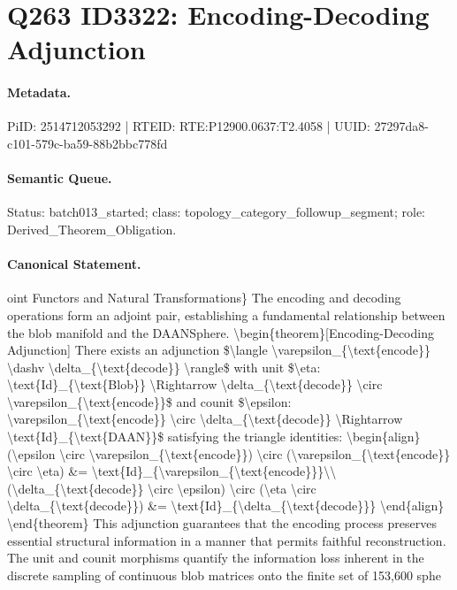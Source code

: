 \section*{Q263 ID3322: Encoding-Decoding Adjunction}
\paragraph{Metadata.}
PiID: 2514712053292 | RTEID: RTE:P12900.0637:T2.4058 | UUID: 27297da8-c101-579c-ba59-88b2bbc778fd

\paragraph{Semantic Queue.}
Status: batch013\_started; class: topology\_category\_followup\_segment; role: Derived\_Theorem\_Obligation.

\paragraph{Canonical Statement.}
oint Functors and Natural Transformations\} The encoding and decoding operations form an adjoint pair, establishing a fundamental relationship between the blob manifold and the DAANSphere. \textbackslash{}begin\{theorem\}[Encoding-Decoding Adjunction] There exists an adjunction \$\textbackslash{}langle \textbackslash{}varepsilon\_\{\textbackslash{}text\{encode\}\} \textbackslash{}dashv \textbackslash{}delta\_\{\textbackslash{}text\{decode\}\} \textbackslash{}rangle\$ with unit \$\textbackslash{}eta: \textbackslash{}text\{Id\}\_\{\textbackslash{}text\{Blob\}\} \textbackslash{}Rightarrow \textbackslash{}delta\_\{\textbackslash{}text\{decode\}\} \textbackslash{}circ \textbackslash{}varepsilon\_\{\textbackslash{}text\{encode\}\}\$ and counit \$\textbackslash{}epsilon: \textbackslash{}varepsilon\_\{\textbackslash{}text\{encode\}\} \textbackslash{}circ \textbackslash{}delta\_\{\textbackslash{}text\{decode\}\} \textbackslash{}Rightarrow \textbackslash{}text\{Id\}\_\{\textbackslash{}text\{DAAN\}\}\$ satisfying the triangle identities: \textbackslash{}begin\{align\} (\textbackslash{}epsilon \textbackslash{}circ \textbackslash{}varepsilon\_\{\textbackslash{}text\{encode\}\}) \textbackslash{}circ (\textbackslash{}varepsilon\_\{\textbackslash{}text\{encode\}\} \textbackslash{}circ \textbackslash{}eta) \&= \textbackslash{}text\{Id\}\_\{\textbackslash{}varepsilon\_\{\textbackslash{}text\{encode\}\}\}\textbackslash{}\textbackslash{} (\textbackslash{}delta\_\{\textbackslash{}text\{decode\}\} \textbackslash{}circ \textbackslash{}epsilon) \textbackslash{}circ (\textbackslash{}eta \textbackslash{}circ \textbackslash{}delta\_\{\textbackslash{}text\{decode\}\}) \&= \textbackslash{}text\{Id\}\_\{\textbackslash{}delta\_\{\textbackslash{}text\{decode\}\}\} \textbackslash{}end\{align\} \textbackslash{}end\{theorem\} This adjunction guarantees that the encoding process preserves essential structural information in a manner that permits faithful reconstruction. The unit and counit morphisms quantify the information loss inherent in the discrete sampling of continuous blob matrices onto the finite set of 153,600 sphe

